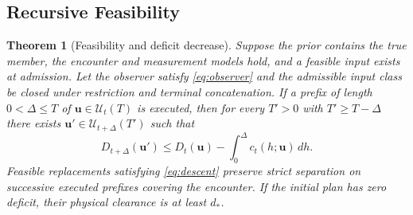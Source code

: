 \documentclass[journal]{IEEEtran}
\newtheorem{theorem}{Theorem}
\theoremstyle{definition}
\newcommand{\vct}[1]{\boldsymbol{#1}}
\begin{document}
\subsection{Recursive Feasibility}
\begin{theorem}[Feasibility and deficit decrease]\label{thm:shift}
Suppose the prior contains the true member, the encounter and measurement
models hold, and a feasible input exists at admission. Let the observer
satisfy \eqref{eq:observer} and the admissible input class be closed
under restriction and terminal concatenation. If a prefix of length
$0<\Delta\le T$ of $\vct u\in\mathcal U_t(T)$ is executed, then for
every $T'>0$ with $T'\ge T-\Delta$ there exists
$\vct u'\in\mathcal U_{t+\Delta}(T')$ such that
\begin{equation}\label{eq:descent}
 D_{t+\Delta}(\vct u')\le D_t(\vct u)
                  -\int_0^\Delta c_t(h;\vct u)\,dh .
\end{equation}
Feasible replacements satisfying \eqref{eq:descent} preserve strict
separation on successive executed prefixes covering the encounter. If
the initial plan has zero deficit, their physical clearance is at least
$d_*$.
\end{theorem}
\end{document}
